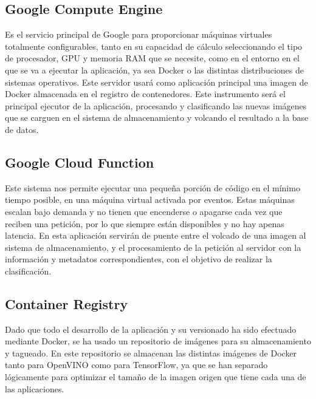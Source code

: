 \subsection{Google Compute Engine}\label{subsec:computeengine}
Es el servicio principal de Google para proporcionar máquinas virtuales totalmente configurables, tanto en su capacidad de cálculo seleccionando el tipo de procesador, GPU y memoria RAM que se necesite, como en el entorno
en el que se va a ejecutar la aplicación, ya sea Docker\cite{docker} o las distintas distribuciones de sistemas operativos.
Este servidor usará como aplicación principal una imagen de Docker almacenada en el registro de contenedores.
Este instrumento será el principal ejecutor de la aplicación, procesando y clasificando las nuevas imágenes que se carguen en el sistema de almacenamiento y volcando el resultado a la base de datos.
\subsection{Google Cloud Function}\label{subsec:cloudfunction}
Este sistema nos permite ejecutar una pequeña porción de código en el mínimo tiempo posible, en una máquina virtual activada por eventos.
Estas máquinas escalan bajo demanda y no tienen que encenderse o apagarse cada vez que reciben una petición, por lo que siempre están disponibles y no hay apenas latencia.
En esta aplicación servirán de puente entre el volcado de una imagen al sistema de almacenamiento, y el procesamiento de la petición al servidor con la información y metadatos correspondientes, con el objetivo de realizar la clasificación.
\subsection{Container Registry}\label{subsec:container-registry}
Dado que todo el desarrollo de la aplicación y su versionado ha sido efectuado mediante Docker, se ha usado un repositorio de imágenes para su almacenamiento y tagueado.
En este repositorio se almacenan las distintas imágenes de Docker tanto para OpenVINO como para TensorFlow, ya que se han separado lógicamente para optimizar el tamaño de la imagen origen que tiene cada una de las aplicaciones.

